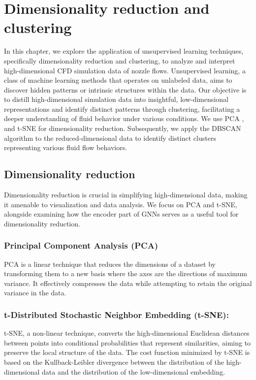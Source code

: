 \chapter{Dimensionality reduction and clustering}
\label{chap:cluster}
In this chapter, we explore the application of unsupervised learning techniques, specifically dimensionality reduction and clustering, to analyze and interpret high-dimensional CFD simulation data of nozzle flows. Unsupervised learning, a class of machine learning methods that operates on unlabeled data, aims to discover hidden patterns or intrinsic structures within the data. Our objective is to distill high-dimensional simulation data into insightful, low-dimensional representations and identify distinct patterns through clustering, facilitating a deeper understanding of fluid behavior under various conditions. We use \gls{PCA} \cite{pearson1901pca}, and \gls{t-SNE} \cite{vandermaaten2008tsne} for dimensionality reduction. Subsequently, we apply the \gls{DBSCAN} algorithm \cite{ester1996dbscan} to the reduced-dimensional data to identify distinct clusters representing various fluid flow behaviors.
\section{Dimensionality reduction}
Dimensionality reduction is crucial in simplifying high-dimensional data, making it amenable to visualization and data analysis. We focus on PCA and t-SNE, alongside examining how the encoder part of GNNs serves as a useful tool for dimensionality reduction.
\subsection{Principal Component Analysis (PCA)}
PCA is a linear technique that reduces the dimensions of a dataset by transforming them to a new basis where the axes are the directions of maximum variance. It effectively compresses the data while attempting to retain the original variance in the data.
\subsection{t-Distributed Stochastic Neighbor Embedding (t-SNE):}
t-SNE, a non-linear technique, converts the high-dimensional Euclidean distances between points into conditional probabilities that represent similarities, aiming to preserve the local structure of the data. The cost function minimized by t-SNE is based on the Kullback-Leibler divergence \cite{csis} between the distribution of the high-dimensional data and the distribution of the low-dimensional embedding.
